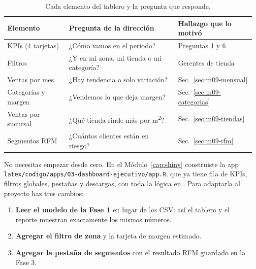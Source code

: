 \begin{table}[H]
\centering
\small
\caption{Cada elemento del tablero y la pregunta que responde.}
\label{tab:m09-tablero}
\begin{tabularx}{\textwidth}{@{}l X l@{}}
\toprule
Elemento & Pregunta de la dirección & Hallazgo que lo motivó \\
\midrule
KPIs (4 tarjetas) & ¿Cómo vamos en el periodo? & Preguntas 1 y 6 \\
Filtros & ¿Y en mi zona, mi tienda o mi categoría? & Gerentes de tienda \\
Ventas por mes & ¿Hay tendencia o solo variación? & Sec.~\ref{sec:m09-mensual} \\
Categorías y margen & ¿Vendemos lo que deja margen? & Sec.~\ref{sec:m09-categorias} \\
Ventas por sucursal & ¿Qué tienda rinde más por m\textsuperscript{2}? & Sec.~\ref{sec:m09-tiendas} \\
Segmentos RFM & ¿Cuántos clientes están en riesgo? & Sec.~\ref{sec:m09-rfm} \\
\bottomrule
\end{tabularx}
\end{table}

No necesitas empezar desde cero. En el Módulo~\ref{cap:shiny} construiste la
app \nolinkurl{latex/codigo/apps/03-dashboard-ejecutivo/app.R}, que ya tiene
fila de KPIs, filtros globales, pestañas y descargas, con toda la lógica en
. Para adaptarla al proyecto haz tres
cambios:

\begin{enumerate}
  \item \textbf{Leer el modelo de la Fase 1} en lugar de los CSV: así el
        tablero y el reporte muestran exactamente los mismos números.
  \item \textbf{Agregar el filtro de zona} y la tarjeta de margen estimado.
  \item \textbf{Agregar la pestaña de segmentos} con el resultado RFM
        guardado en la Fase 3.
\end{enumerate}

